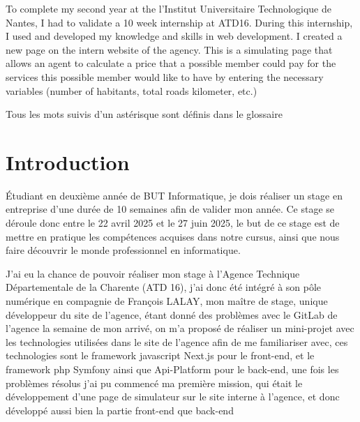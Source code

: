 \documentclass[a4paper,12pt]{report}
\begin{document}
\vspace{1em}

To complete my second year at the l’Institut Universitaire Technologique de Nantes, I had to validate a 10 week internship at ATD16. During this internship, I used and developed my knowledge and skills in web development. I created a new page on the intern website of the agency. This is a simulating page that allows an agent to calculate a price that a possible member could pay for the services this possible member would like to have by entering the necessary variables (number of habitants, total roads kilometer, etc.)


\tableofcontents               

\newpage
\thispagestyle{empty}
\vspace*{\fill}            
\begin{center}             
Tous les mots suivis d'un astérisque sont définis dans le glossaire
\end{center}
\vspace*{\fill}            


\chapter{Introduction}         
Étudiant en deuxième année de BUT Informatique, je dois réaliser un stage en entreprise d'une durée de 10 semaines afin de valider mon année. Ce stage se déroule donc entre le 22 avril 2025 et le 27 juin 2025, le but de ce stage est de mettre en pratique les compétences acquises dans notre cursus, ainsi que nous faire découvrir le monde professionnel en informatique.

\vspace{1em}

J'ai eu la chance de pouvoir réaliser mon stage à l'Agence Technique Départementale de la Charente (ATD 16), j'ai donc été intégré à son pôle numérique en compagnie de François LALAY, mon maître de stage, unique développeur du site de l'agence, étant donné des problèmes avec le GitLab de l'agence la semaine de mon arrivé, on m'a proposé de réaliser un mini-projet avec les technologies utilisées dans le site de l'agence afin de me familiariser avec, ces technologies sont le framework javascript Next.js pour le front-end, et le framework php Symfony ainsi que Api-Platform pour le back-end, une fois les problèmes résolus j'ai pu commencé ma première mission, qui était le développement d'une page de simulateur sur le site interne à l'agence, et donc développé aussi bien la partie front-end que back-end
\end{document}
